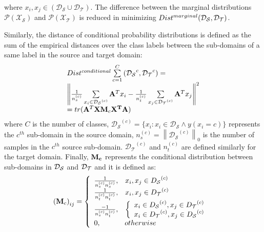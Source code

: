 \documentclass[10pt,twocolumn,letterpaper]{article}
\begin{document}
\begin{CJK*}{UTF8}{gkai}
where ${x_i},{x_j} \in (\mathcal{D_S} \cup \mathcal{D_T})$. The difference between the marginal distributions $\mathcal{P}(\mathcal{X_S})$ and $\mathcal{P}(\mathcal{X_T})$ is reduced in minimizing {$Dis{t^{marginal}}({{\cal D}_{\cal S}},{{\cal D}_{\cal T}})$}.

Similarly, the distance of conditional probability distributions is defined as the sum of the empirical distances over the class labels between the sub-domains of a same label in the source and target domain: 
\begin{equation}\label{eq:conditional}
		\begin{array}{c}
		\begin{array}{l}
		Dis{t^{conditional}}\sum\limits_{c = 1}^C {({{\cal D}_{\cal S}}^c,{{\cal D}_{\cal T}}^c)}  = \\
		{\left\| {\frac{1}{{n_s^{(c)}}}\sum\limits_{{x_i} \in {{\cal D}_{\cal S}}^{(c)}} {{{\bf{A}}^T}{x_i}}  - \frac{1}{{n_t^{(c)}}}\sum\limits_{{x_j} \in {{\cal D}_{\cal T}}^{(c)}} {{{\bf{A}}^T}{x_j}} } \right\|^2}\\
		= tr({{\bf{A}}^T}{\bf{X}}{{\bf{M}}_c}{{\bf{X}}^{\bf{T}}}{\bf{A}})
		\end{array}
		\end{array}
\end{equation}
where $C$ is the number of classes, $\mathcal{D_S}^{(c)} = \{ {x_i}:{x_i} \in \mathcal{D_S} \wedge y({x_i} = c)\} $ represents the ${c^{th}}$ sub-domain in the source domain, $n_s^{(c)} = {\left\| {\mathcal{D_S}^{(c)}} \right\|_0}$ is the number of samples in the ${c^{th}}$ {source} sub-domain. $\mathcal{D_T}^{(c)}$ and $n_t^{(c)}$ are defined similarly for the target domain. Finally, $\bf M_c$ represents the conditional distribution between sub-domains in ${{\cal D}_{\cal S}}$ and ${{\cal D}_{\cal T}}$ and it is defined as: 
\begin{equation}\label{eq:marginal}
\begin{array}{*{20}{c}}
{{{({{\bf{M}}_c})}_{ij}} = \left\{ {\begin{array}{*{20}{l}}
		{\frac{1}{{n_s^{(c)}n_s^{(c)}}},\;\;\;{x_i},{x_j} \in {D_{\cal S}}^{(c)}}\\
		{\frac{1}{{n_t^{(c)}n_t^{(c)}}},\;\;\;{x_i},{x_j} \in {D_{\cal T}}^{(c)}}\\
		{\frac{{ - 1}}{{n_s^{(c)}n_t^{(c)}}},\;\;\;\left\{ {\begin{array}{*{20}{l}}
				{{x_i} \in {D_{\cal S}}^{(c)},{x_j} \in {D_{\cal T}}^{(c)}}\\
				{{x_i} \in {D_{\cal T}}^{(c)},{x_j} \in {D_{\cal S}}^{(c)}}
				\end{array}} \right.}\\
		{0,\;\;\;\;\;\;\;\;\;\;\;\;otherwise}
		\end{array}} \right.}
\end{array}
\end{equation}


\end{CJK*}
\end{document}
